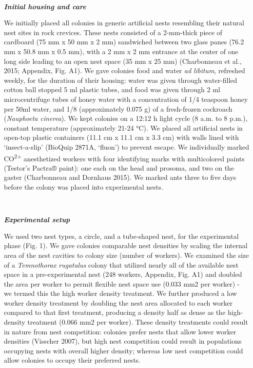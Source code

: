 \documentclass[3p]{elsarticle} %
\begin{document}
~

\textbf{\emph{Initial housing and care}}

We initially placed all colonies in generic artificial nests resembling
their natural nest sites in rock crevices. These nests consisted of a
2-mm-thick piece of cardboard (75 mm x 50 mm x 2 mm) sandwiched between
two glass panes (76.2 mm x 50.8 mm x 0.5 mm), with a 2 mm x 2 mm
entrance at the center of one long side leading to an open nest space
(35 mm x 25 mm) (Charbonneau et al., 2015; Appendix, Fig. A1). We gave
colonies food and water \emph{ad libitum}, refreshed weekly, for the
duration of their housing: water was given through water-filled cotton
ball stopped 5 ml plastic tubes, and food was given through 2 ml
microcentrifuge tubes of honey water with a concentration of 1/4
teaspoon honey per 50ml water, and 1/8 (approximately 0.075 g) of a
fresh-frozen cockroach (\emph{Nauphoeta cinerea}). We kept colonies on a
12:12 h light cycle (8 a.m. to 8 p.m.), constant temperature
(approximately 21-24 °C). We placed all artificial nests in open-top
plastic containers (11.1 cm x 11.1 cm x 3.3 cm) with walls lined with
`insect-a-slip' (BioQuip 2871A, `fluon') to prevent escape. We
individually marked CO\textsuperscript{2+} anesthetized workers with
four identifying marks with multicolored paints (Testor's Pactra®
paint): one each on the head and prosoma, and two on the gaster
(Charbonneau and Dornhaus 2015). We marked ants three to five days
before the colony was placed into experimental nests.

~

\textbf{\emph{Experimental setup}}

We used two nest types, a circle, and a tube-shaped nest, for the
experimental phase (Fig. 1). We gave colonies comparable nest densities
by scaling the internal area of the nest cavities to colony size (number
of workers). We examined the size of a \emph{Temnothorax rugatulus}
colony that utilized nearly all of the available nest space in a
pre-experimental nest (248 workers, Appendix, Fig. A1) and doubled the
area per worker to permit flexible nest space use (0.033 mm2 per worker)
- we termed this the high worker density treatment. We further produced
a low worker density treatment by doubling the nest area allocated to
each worker compared to that first treatment, producing a density half
as dense as the high-density treatment (0.066 mm2 per worker). These
density treatments could result in nature from nest competition:
colonies prefer nests that allow lower worker densities (Visscher 2007),
but high nest competition could result in populations occupying nests
with overall higher density; whereas low nest competition could allow
colonies to occupy their preferred nests.
\end{document}
